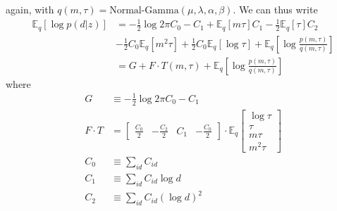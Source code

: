 \documentclass[11pt]{article}
\begin{document}
again, with $q(m, \tau) = \text{Normal-Gamma}(\mu, \lambda, \alpha, \beta)$. We can thus write
\begin{align}
    \mathbb{E}_q[\log p(d|z)] &= -\frac{1}{2}\log 2\pi C_0 - C_1 + 
    \mathbb{E}_q[m\tau] C_1 -\frac{1}{2}\mathbb{E}_q[\tau] C_2  \\
    &- \frac{1}{2} C_0 \mathbb{E}_q[m^2\tau] + \frac{1}{2} C_0 \mathbb{E}_q[\log \tau] + \mathbb{E}_q\left[\log \frac{p(m, \tau)}{q(m, \tau)} \right] \\
    &= G + F \cdot T(m, \tau) + \mathbb{E}_q\left[\log \frac{p(m, \tau)}{q(m, \tau)} \right] 
\end{align}
where
\begin{align}
    G &\equiv -\frac{1}{2}\log 2\pi C_0 - C_1 \\
    F \cdot T &=
    \begin{bmatrix}
        \frac{C_0}{2} & 
        -\frac{C_2}{2} & 
        C_1 &
        -\frac{C_0}{2}
    \end{bmatrix} \cdot \mathbb{E}_q
    \begin{bmatrix}
        \log \tau \\
        \tau \\
        m\tau \\
        m^2 \tau
    \end{bmatrix} \\
    C_0 &\equiv \sum_{id} C_{id} \\
    C_1 &\equiv \sum_{id} C_{id} \log d \\
    C_2 &\equiv \sum_{id} C_{id} (\log d)^2
\end{align}
\end{document}
